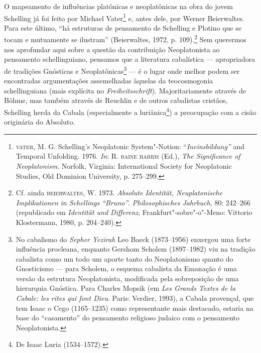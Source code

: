 O mapeamento de influências platônicas e neoplatônicas na obra do
jovem Schelling já foi feito por Michael Vater\footnote{
\textsc{vater},
M. G. Schelling's Neoplatonic System"-Notion:
``\emph{Ineinsbildung''} and Temporal Unfolding. 1976.
\emph{In}: R. \textsc{baine} \textsc{harris} (Ed.), \textit{The Significance of
Neoplatonism}. Norfolk, Virginia: International Society for
Neoplatonic Studies, Old Dominion University, p. 275--299.} e,
antes dele, por Werner Beierwaltes. Para este último, “há
estruturas de pensamento de Schelling e Plotino que se tocam e
mutuamente se ilustram” (Beierwaltes, 1972, p. 109).\footnote{
Cf. ainda \textsc{beierwaltes}, W. 1973. \textit{Absolute Identität,
Neuplatonische Implikationen in Schellings “Bruno”}.
\emph{Philosophisches Jahrbuch}, 80: 242--266 (republicado em
\textit{Identität und Differenz}, Frankfurt"-sobre"-o"-Meno:
Vittorio Klostermann, 1980, p. 204--240).} Sem querermos nos
aprofundar aqui sobre a questão da contribuição Neoplatonista ao
pensamento schellinguiano, pensamos que a literatura cabalística
--- apropriadora de tradições Gnósticas e Neoplatônicas\footnote{
No cabalismo do \emph{Sepher Yezirah} Leo Baeck (1873--1956)
enxergou uma forte influência procleana, enquanto Gershom
Scholem (1897--1982) viu na tradição cabalista como um todo um
aporte tanto do Neoplatonismo quanto do Gnosticismo --- para
Scholem, o esquema cabalista da Emanação é uma versão da
estrutura Neoplatonista, modificada pela sobreposição de uma
hierarquia Gnóstica. Para Charles Mopsik (em \textit{Les Grands
Textes de la Cabale: les rites qui font Dieu}. Paris: Verdier,
1993), a Cabala provençal, que tem Isaac o Cego (1165--1235) como
representante mais destacado, estaria na base do “casamento” do
pensamento religioso judaico com o pensamento Neoplatonista.} ---
é o lugar onde melhor podem ser encontradas argumentações
assemelhadas àquelas da teocosmogonia schellinguiana (mais
explícita no \emph{Freiheitsschrift}). Majoritariamente
através de Böhme, mas também através de Reuchlin e de outros
cabalistas cristãos, Schelling herda da Cabala (especialmente a
luriânica\footnote{ De Isaac Luria (1534--1572).}) a preocupação
com a cisão originária do Absoluto.

